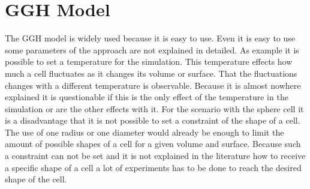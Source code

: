 \section{GGH Model}
The \ac{GGH} model is widely used because it is easy to use. Even it is easy to use some parameters of the approach are not explained in detailed. As example it is possible to set a temperature for the simulation. This temperature effects how much a cell fluctuates as it changes its volume or surface. That the fluctuations changes with a different temperature is observable. Because it is almost nowhere explained it is questionable if this is the only effect of the temperature in the simulation or are the other effects with it. \newline
For the scenario with the sphere cell it is a disadvantage that it is not possible to set a constraint of the shape of a cell. The use of one radius or one diameter would already be enough to limit the amount of possible shapes of a cell for a given volume and surface. Because such a constraint can not be set and it is not explained in the literature how to receive a specific shape of a cell a lot of experiments has to be done to reach the desired shape of the cell.